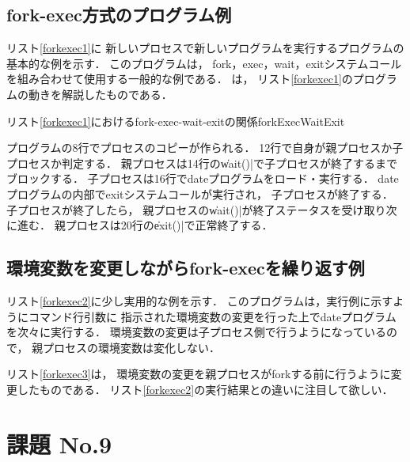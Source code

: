 \subsection{fork-exec方式のプログラム例}
リスト\ref{forkexec1}に
新しいプロセスで新しいプログラムを実行するプログラムの基本的な例を示す．
このプログラムは，
fork，exec，wait，exitシステムコールを組み合わせて使用する一般的な例である．
は，
リスト\ref{forkexec1}のプログラムの動きを解説したものである．

  
  
    {リスト\ref{forkexec1}におけるfork-exec-wait-exitの関係}{forkExecWaitExit}

プログラムの8行でプロセスのコピーが作られる．
12行で自身が親プロセスか子プロセスか判定する．
親プロセスは14行の\|wait()|で子プロセスが終了するまでブロックする．
子プロセスは16行でdateプログラムをロード・実行する．
dateプログラムの内部でexitシステムコールが実行され，
子プロセスが終了する．
子プロセスが終了したら，
親プロセスの\|wait()|が終了ステータスを受け取り次に進む．
親プロセスは20行の\|exit()|で正常終了する．

\subsection{環境変数を変更しながらfork-execを繰り返す例}
リスト\ref{forkexec2}に少し実用的な例を示す．
このプログラムは，実行例に示すようにコマンド行引数に
指示された環境変数の変更を行った上でdateプログラムを次々に実行する．
環境変数の変更は子プロセス側で行うようになっているので，
親プロセスの環境変数は変化しない．

  

リスト\ref{forkexec3}は，
環境変数の変更を親プロセスがforkする前に行うように変更したものである．
リスト\ref{forkexec2}の実行結果との違いに注目して欲しい．

  


\section*{課題 No.9}

